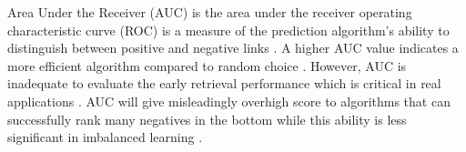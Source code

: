 Area Under the Receiver (AUC) \cite{hanley1982meaning} is the area under the receiver operating characteristic curve (ROC) is a measure of the prediction algorithm's ability to distinguish between positive and negative links \cite{arrar2023comprehensive}. A higher AUC value indicates a more efficient algorithm compared to random choice \cite{mumin2022efficient}. However, AUC is inadequate to evaluate the early retrieval performance which is critical in real applications \cite{zhou2021progresses}. AUC will give misleadingly overhigh score to algorithms that can successfully rank many negatives in the bottom while this ability is less significant in imbalanced learning \cite{yang2015evaluating, lichtnwalter2012link}.


